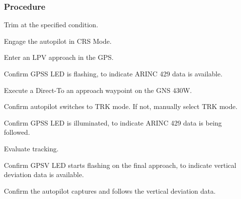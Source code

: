 \subsubsection*{Procedure}
 \begin{compactenum}
    \item Trim at the specified condition.
    \item Engage the autopilot in CRS Mode.
    \item Enter an LPV approach in the GPS.
    \item Confirm GPSS LED is flashing, to indicate ARINC 429 data is available.
    \item Execute a Direct-To an approach waypoint on the GNS 430W.
    \item Confirm autopilot switches to TRK mode.  If not, manually select TRK mode.
    \item Confirm GPSS LED is illuminated, to indicate ARINC 429 data is being followed.
    \item Evaluate tracking.
    \item Confirm GPSV LED starts flashing on the final approach, to indicate vertical deviation data is available.
    \item Confirm the autopilot captures and follows the vertical deviation data.
    \end{compactenum}
